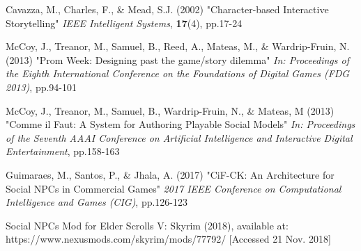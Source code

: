 \documentclass{sig-alternate-05-2015}
\begin{document}
\begin{thebibliography}{20}
Cavazza, M., Charles, F., \& Mead, S.J. (2002)
"Character-based Interactive Storytelling"
\textit{IEEE Intelligent Systems}, \textbf{17}(4), pp.17-24

McCoy, J., Treanor, M., Samuel, B., Reed, A., Mateas, M., \& Wardrip-Fruin, N. (2013)
"Prom Week: Designing past the game/story dilemma"
\textit{In: Proceedings of the Eighth International Conference on the Foundations of Digital Games (FDG 2013)}, pp.94-101

McCoy, J., Treanor, M., Samuel, B., Wardrip-Fruin, N., \& Mateas, M (2013)
"Comme il Faut: A System for Authoring Playable Social Models"
\textit{In: Proceedings of the Seventh AAAI Conference on Artificial Intelligence and Interactive Digital Entertainment}, pp.158-163

Guimaraes, M., Santos, P., \& Jhala, A. (2017)
"CiF-CK: An Architecture for Social NPCs in
Commercial Games"
\textit{2017 IEEE Conference on Computational Intelligence and Games (CIG)}, pp.126-123

Social NPCs Mod for Elder Scrolls V: Skyrim (2018), available at: https://www.nexusmods.com/skyrim/mods/77792/ [Accessed 21 Nov. 2018]


\end{thebibliography}
 
\end{document}
